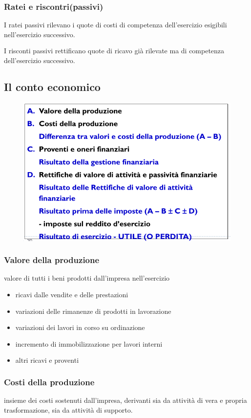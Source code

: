 \subsubsection{Ratei e riscontri(passivi)}
I ratei passivi rilevano i quote di costi di competenza dell'esercizio esigibili nell'esercizio successivo.

I risconti passivi rettificano quote di ricavo già rilevate ma
di competenza dell'esercizio successivo.


\subsection{Il conto economico}
\begin{figure}[H]
    \centering
    \includegraphics[width=0.7\linewidth]{2/img/Screenshot from 2022-07-07 16-11-55.png}
\end{figure}

\subsubsection{Valore della produzione}
valore di tutti i beni prodotti dall'impresa nell'esercizio
\begin{itemize}
    \item ricavi dalle vendite e delle prestazioni
    \item variazioni delle rimanenze di prodotti in lavorazione
    \item variazioni dei lavori in corso su ordinazione
    \item incremento di immobilizzazione per lavori interni
    \item altri ricavi e proventi
\end{itemize}

\subsubsection{Costi della produzione}
insieme dei costi sostenuti dall'impresa, derivanti sia da attività di
vera e propria trasformazione, sia da attività di supporto.



